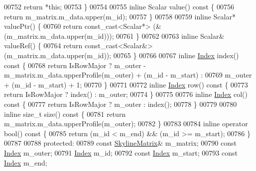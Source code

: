 \begin{DoxyCode}
00752         \textcolor{keywordflow}{return} *\textcolor{keyword}{this};
00753     \}
00754 
00755     \textcolor{keyword}{inline} Scalar value()\textcolor{keyword}{ const }\{
00756         \textcolor{keywordflow}{return} m\_matrix.m\_data.upper(m\_id);
00757     \}
00758 
00759     \textcolor{keyword}{inline} Scalar* valuePtr() \{
00760         \textcolor{keywordflow}{return} \textcolor{keyword}{const\_cast<}Scalar*\textcolor{keyword}{>} (&(m\_matrix.m\_data.upper(m\_id)));
00761     \}
00762 
00763     \textcolor{keyword}{inline} Scalar& valueRef() \{
00764         \textcolor{keywordflow}{return} \textcolor{keyword}{const\_cast<}Scalar&\textcolor{keyword}{>} (m\_matrix.m\_data.upper(m\_id));
00765     \}
00766 
00767     \textcolor{keyword}{inline} \hyperlink{group___core___module_a554f30542cc2316add4b1ea0a492ff02}{Index} index()\textcolor{keyword}{ const }\{
00768         \textcolor{keywordflow}{return} IsRowMajor ? m\_outer - m\_matrix.m\_data.upperProfile(m\_outer) + (m\_id - m\_start) :
00769                 m\_outer + (m\_id - m\_start) + 1;
00770     \}
00771 
00772     \textcolor{keyword}{inline} \hyperlink{group___core___module_a554f30542cc2316add4b1ea0a492ff02}{Index} row()\textcolor{keyword}{ const }\{
00773         \textcolor{keywordflow}{return} IsRowMajor ? index() : m\_outer;
00774     \}
00775 
00776     \textcolor{keyword}{inline} \hyperlink{group___core___module_a554f30542cc2316add4b1ea0a492ff02}{Index} col()\textcolor{keyword}{ const }\{
00777         \textcolor{keywordflow}{return} IsRowMajor ? m\_outer : index();
00778     \}
00779 
00780     \textcolor{keyword}{inline} \textcolor{keywordtype}{size\_t} size()\textcolor{keyword}{ const }\{
00781         \textcolor{keywordflow}{return} m\_matrix.m\_data.upperProfile(m\_outer);
00782     \}
00783 
00784     \textcolor{keyword}{inline} \textcolor{keyword}{operator} bool()\textcolor{keyword}{ const }\{
00785         \textcolor{keywordflow}{return} (m\_id < m\_end) && (m\_id >= m\_start);
00786     \}
00787 
00788 \textcolor{keyword}{protected}:
00789     \textcolor{keyword}{const} \hyperlink{class_eigen_1_1_skyline_matrix}{SkylineMatrix}& m\_matrix;
00790     \textcolor{keyword}{const} \hyperlink{group___core___module_a554f30542cc2316add4b1ea0a492ff02}{Index} m\_outer;
00791     \hyperlink{group___core___module_a554f30542cc2316add4b1ea0a492ff02}{Index} m\_id;
00792     \textcolor{keyword}{const} \hyperlink{group___core___module_a554f30542cc2316add4b1ea0a492ff02}{Index} m\_start;
00793     \textcolor{keyword}{const} \hyperlink{group___core___module_a554f30542cc2316add4b1ea0a492ff02}{Index} m\_end;

\end{DoxyCode}
